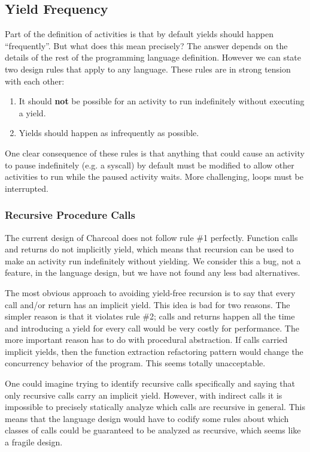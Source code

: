 \documentclass[10pt,preprint]{sigplanconf}
\begin{document}
\subsection{Yield Frequency}

Part of the definition of activities is that by default yields should happen ``frequently''.
But what does this mean precisely?
The answer depends on the details of the rest of the programming language definition.
However we can state two design rules that apply to any language.
These rules are in strong tension with each other:

\begin{enumerate}
\item It should \textbf{not} be possible for an activity to run indefinitely without executing a yield.
\item Yields should happen as infrequently as possible.
\end{enumerate}

One clear consequence of these rules is that anything that could cause an activity to pause indefinitely (e.g. a syscall) by default must be modified to allow other activities to run while the paused activity waits.
More challenging, loops must be interrupted.

\subsubsection{Recursive Procedure Calls}

The current design of Charcoal does not follow rule \#1 perfectly.
Function calls and returns do not implicitly yield, which means that recursion can be used to make an activity run indefinitely without yielding.
We consider this a bug, not a feature, in the language design, but we have not found any less bad alternatives.

The most obvious approach to avoiding yield-free recursion is to say that every call and/or return has an implicit yield.
This idea is bad for two reasons.
The simpler reason is that it violates rule \#2; calls and returns happen all the time and introducing a yield for every call would be very costly for performance.
The more important reason has to do with procedural abstraction.
If calls carried implicit yields, then the function extraction refactoring pattern would change the concurrency behavior of the program.
This seems totally unacceptable.

One could imagine trying to identify recursive calls specifically and saying that only recursive calls carry an implicit yield.
However, with indirect calls it is impossible to precisely statically analyze which calls are recursive in general.
This means that the language design would have to codify some rules about which classes of calls could be guaranteed to be analyzed as recursive, which seems like a fragile design.
\end{document}
